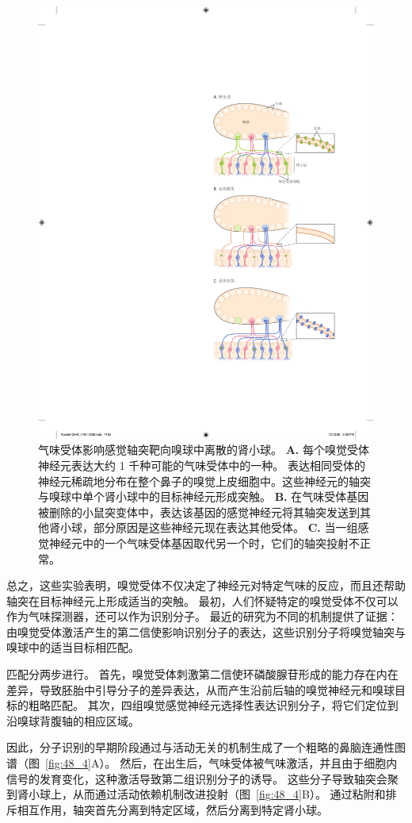 \begin{figure}[htbp]
	\centering
	\includegraphics[width=0.7\linewidth]{chap48/fig_48_3}
	\caption{气味受体影响感觉轴突靶向嗅球中离散的肾小球\cite{sanes2009many}。
		\textbf{A.} 每个嗅觉受体神经元表达大约 1 千种可能的气味受体中的一种。
		表达相同受体的神经元稀疏地分布在整个鼻子的嗅觉上皮细胞中。这些神经元的轴突与嗅球中单个肾小球中的目标神经元形成突触。
		\textbf{B.} 在气味受体基因被删除的小鼠突变体中，表达该基因的感觉神经元将其轴突发送到其他肾小球，部分原因是这些神经元现在表达其他受体。
		\textbf{C.} 当一组感觉神经元中的一个气味受体基因取代另一个时，它们的轴突投射不正常。}
	\label{fig:48_3}
\end{figure}


总之，这些实验表明，嗅觉受体不仅决定了神经元对特定气味的反应，而且还帮助轴突在目标神经元上形成适当的突触。
最初，人们怀疑特定的嗅觉受体不仅可以作为气味探测器，还可以作为识别分子。
最近的研究为不同的机制提供了证据：
由嗅觉受体激活产生的第二信使影响识别分子的表达，这些识别分子将嗅觉轴突与嗅球中的适当目标相匹配。


匹配分两步进行。
首先，嗅觉受体刺激第二信使环磷酸腺苷形成的能力存在内在差异，导致胚胎中引导分子的差异表达，从而产生沿前后轴的嗅觉神经元和嗅球目标的粗略匹配。
其次，四组嗅觉感觉神经元选择性表达识别分子，将它们定位到沿嗅球背腹轴的相应区域。


因此，分子识别的早期阶段通过与活动无关的机制生成了一个粗略的鼻脑连通性图谱（图~\ref{fig:48_4}A）。
然后，在出生后，气味受体被气味激活，并且由于细胞内信号的发育变化，这种激活导致第二组识别分子的诱导。
这些分子导致轴突会聚到肾小球上，从而通过活动依赖机制改进投射（图~\ref{fig:48_4}B）。
通过粘附和排斥相互作用，轴突首先分离到特定区域，然后分离到特定肾小球。


